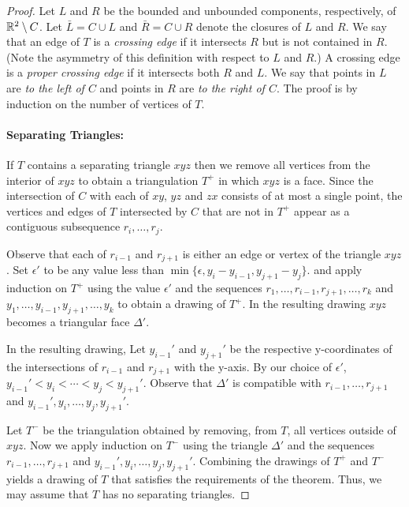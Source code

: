 \documentclass{patmorin}
\begin{document}
\begin{proof}
   Let $L$ and $R$ be the bounded
   and unbounded components, respectively, of $\mathbb{R}^2\setminus C$. Let
   $\bar{L}=C\cup L$ and $\bar{R}=C\cup R$ denote the closures of $L$
   and $R$.  We say that an edge of $T$ is a \emph{crossing edge} if
   it intersects $R$ but is not contained in $R$.  (Note the asymmetry
   of this definition with respect to $L$ and $R$.)  A crossing edge
   is a \emph{proper crossing edge} if it intersects both $R$ and $L$.
   We say that points in $L$ are \emph{to the left of $C$} and points
   in $R$ are \emph{to the right of $C$}.
   The proof is by induction on the number of vertices of $T$.

   \paragraph{Separating Triangles:}
   If $T$ contains a separating triangle $xyz$ then we remove all vertices
   from the interior of $xyz$ to obtain a triangulation $T^+$ in which
   $xyz$ is a face.  Since the intersection of $C$ with each of $xy$,
   $yz$ and $zx$ consists of at most a single point, the vertices and
   edges of $T$ intersected by $C$ that are not in $T^+$ appear as a
   contiguous subsequence $r_i,\ldots,r_j$.

   Observe that each of $r_{i-1}$ and $r_{j+1}$ is either an edge
   or vertex of the triangle $xyz$.  Set $\epsilon'$ to be any
   value less than $\min\{\epsilon,y_{i}-y_{i-1}, y_{j+1}-y_j\}$.
   and apply induction on $T^+$ using the value $\epsilon'$
   and the sequences $r_1,\ldots,r_{i-1},r_{j+1},\ldots,r_k$ and
   $y_1,\ldots,y_{i-1},y_{j+1},\ldots,y_k$ to obtain a drawing of $T^+$.
   In the resulting drawing $xyz$ becomes a triangular face $\Delta'$.

   In the resulting drawing, Let $y_{i-1}'$ and $y_{j+1}'$
   be the respective y-coordinates of the intersections of
   $r_{i-1}$ and $r_{j+1}$ with the y-axis.  By our choice of
   $\epsilon'$, $y_{i-1}'<y_i<\cdots<y_j<y_{j+1}'$.  Observe that
   $\Delta'$ is compatible with $r_{i-1},\ldots,r_{j+1}$ and
   $y_{i-1}',y_i,\ldots,y_j,y_{j+1}'$.

   Let $T^-$ be the triangulation obtained by removing, from $T$, all
   vertices outside of $xyz$.  Now we apply induction on $T^-$ using
   the triangle $\Delta'$ and the sequences $r_{i-1},\ldots,r_{j+1}$ and
   $y_{i-1}',y_i,\ldots,y_{j},y_{j+1}'$.  Combining the drawings of $T^+$
   and $T^-$ yields a drawing of $T$ that satisfies the requirements of
   the theorem.  Thus, we may assume that $T$ has no separating triangles.


\end{proof}
\end{document}
